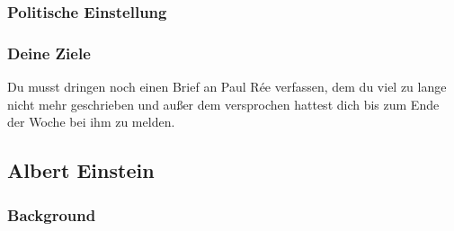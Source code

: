 \documentclass[12pt, a4paper, openany]{report}
\begin{document}
\subsubsection{Politische Einstellung}
\subsubsection{Deine Ziele}
Du musst dringen noch einen Brief an Paul Rée verfassen, dem du viel zu lange nicht mehr geschrieben und außer dem versprochen hattest dich bis zum Ende der Woche bei ihm zu melden. 

\newpage


\subsection{Albert Einstein}
\subsubsection{Background}
\end{document}
